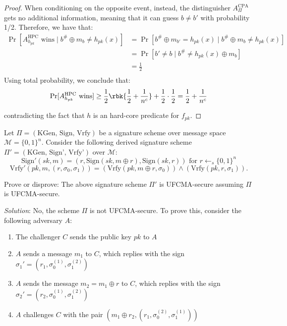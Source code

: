 \documentclass[a4paper, 12pt]{report}
\begin{document}
\begin{proof}
        When conditioning on the opposite event, instead, the distinguisher $A^{\text{CPA}}_{\Pi}$ gets no additional information, meaning that it can guess $b \neq b'$ with probability 1/2. Therefore, we have that:
        \[\begin{split}
            \Pr[\text{$A^{\text{HPC}}_{h_{pk}}$ wins} \mid b^{\#} \oplus m_b \neq h_{pk}(x)] &= \Pr[b^{\#} \oplus m_{b'} = h_{pk}(x) \mid b^{\#} \oplus m_b \neq h_{pk}(x)] \\
            &= \Pr[b' \neq b \mid b^{\#} \neq h_{pk}(x) \oplus m_b] \\
            &= \frac{1}{2} \\
        \end{split}\] 
        Using total probability, we conclude that:
        \[\Pr[\text{$A^{\text{HPC}}_{h_{pk}}$ wins}] \geq \frac{1}{2} \rbk{\frac{1}{2}+\frac{1}{n^c}} + \frac{1}{2} \cdot \frac{1}{2} = \frac{1}{2}+\frac{1}{n^c}\]

        contradicting the fact that $h$ is an hard-core predicate for $f_{pk}$.
    \end{proof}

    \begin{framedprob}{}
        Let $\Pi = (\text{KGen, Sign, Vrfy})$ be a signature scheme over message space $\mathcal{M} = \{0, 1\}^n$. Consider the following derived signature scheme $\Pi' = (\text{KGen, Sign', Vrfy'})$ over $\mathcal{M}$:
        \[ \text{Sign}'(sk, m) = (r, \text{Sign}(sk, m \oplus r), \text{Sign}(sk, r)) \text{ for } r \leftarrow_s \{0, 1\}^n \]
        \[ \text{Vrfy}'(pk, m, (r, \sigma_0, \sigma_1)) = (\text{Vrfy}(pk, m \oplus r, \sigma_0)) \land (\text{Vrfy}(pk, r, \sigma_1)). \]

        Prove or disprove: The above signature scheme $\Pi'$ is UFCMA-secure assuming $\Pi$ is UFCMA-secure.
    \end{framedprob}

    \textit{Solution}: No, the scheme $\Pi$ is not UFCMA-secure. To prove this, consider the following adversary $A$:
    \begin{enumerate}
        \item The challenger $C$ sends the public key $pk$ to $A$
        \item $A$ sends a message $m_1$ to $C$, which replies with the sign $\sigma_1' = (r_1, \sigma^{(1)}_0, \sigma_1^{(2)})$
        \item $A$ sends the message $m_2 = m_1 \oplus r$ to $C$, which replies with the sign $\sigma_2' = (r_2, \sigma^{(1)}_0, \sigma_1^{(2)})$
        \item $A$ challenges $C$ with the pair $(m_1 \oplus r_2, (r_1, \sigma^{(2)}_0, \sigma^{(1)}_1))$
    \end{enumerate}
\end{document}
